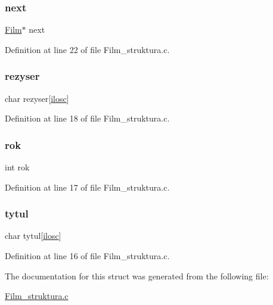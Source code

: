 \subsubsection{\texorpdfstring{next}{next}}
{\footnotesize\ttfamily \hyperlink{_film__struktura_8c_ad2e5228e76da3af7ebed978bbc379920}{Film}$\ast$ next}



Definition at line 22 of file Film\+\_\+struktura.\+c.

\mbox{\label{struct_f_i_l_m_a0e0f2d3232f2bec0dc12fea4b77b01d2}} 
\subsubsection{\texorpdfstring{rezyser}{rezyser}}
{\footnotesize\ttfamily char rezyser\mbox{[}\hyperlink{_wypozyczenie__struktura_8c_a802c84452854799df868a4a660d3d58a}{ilosc}\mbox{]}}



Definition at line 18 of file Film\+\_\+struktura.\+c.

\mbox{\label{struct_f_i_l_m_ab216bb7eaebb4b2665b3a7e9d52d98d0}} 
\subsubsection{\texorpdfstring{rok}{rok}}
{\footnotesize\ttfamily int rok}



Definition at line 17 of file Film\+\_\+struktura.\+c.

\mbox{\label{struct_f_i_l_m_a4db90baba08e1990c11d4cd33502c224}} 
\subsubsection{\texorpdfstring{tytul}{tytul}}
{\footnotesize\ttfamily char tytul\mbox{[}\hyperlink{_wypozyczenie__struktura_8c_a802c84452854799df868a4a660d3d58a}{ilosc}\mbox{]}}



Definition at line 16 of file Film\+\_\+struktura.\+c.



The documentation for this struct was generated from the following file\+:\begin{DoxyCompactItemize}
\item 
\hyperlink{_film__struktura_8c}{Film\+\_\+struktura.\+c}\end{DoxyCompactItemize}
